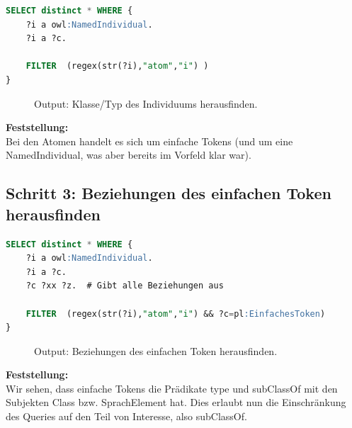 \begin{lstlisting}[caption={Klasse/Typ des Individuums herausfinden},captionpos=b,language=SQL]
SELECT distinct * WHERE { 
	?i a owl:NamedIndividual.
	?i a ?c.
	
	FILTER  (regex(str(?i),"atom","i") )
}
\end{lstlisting}

\begin{figure}[H]
\centering {}
\caption{Output: Klasse/Typ des Individuums herausfinden.\label{fig:atom_2}\protect\footnotemark}
\end{figure}

\textbf{Feststellung:}\\  Bei den Atomen handelt es sich um einfache Tokens (und um eine NamedIndividual, was aber bereits im Vorfeld klar war).

\subsection{Schritt 3: Beziehungen des einfachen Token herausfinden}
\label{ssec:anh_beispiel_f_2}

\begin{lstlisting}[caption={Beziehungen des einfachen Token herausfinden},captionpos=b,language=SQL]
SELECT distinct * WHERE { 
	?i a owl:NamedIndividual.
	?i a ?c.
	?c ?xx ?z. 	# Gibt alle Beziehungen aus
	
	FILTER  (regex(str(?i),"atom","i") && ?c=pl:EinfachesToken)
}
\end{lstlisting}

\begin{figure}[H]
\centering {}
\caption{Output: Beziehungen des einfachen Token herausfinden.\label{fig:atom_3}\protect\footnotemark}
\end{figure}

\textbf{Feststellung:}\\ Wir sehen, dass einfache Tokens die Prädikate type und subClassOf mit den Subjekten Class bzw. SprachElement hat. Dies erlaubt nun die Einschränkung des Queries auf den Teil von Interesse, also subClassOf.

